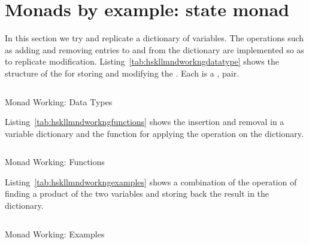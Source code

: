 \documentclass[thesis-solanki.tex]{subfiles}
\begin{document}
\section{Monads by example: state monad}

In this section we try and replicate a dictionary of variables. The operations such as adding and removing entries
to and from the dictionary are implemented so as to replicate modification.
Listing~\ref{tab:hskllmndworkngdatatype} shows the structure of the  for
storing and modifying the .
Each  is a ,  pair.

\begin{code-list}[H]
  \begin{singlespace}
    \inputminted[linenos, firstline=22, lastline=35]{haskell}{haskell-monad-working-2.hs}
  \end{singlespace}
  \caption{ Monad Working: Data Types}
\label{tab:hskllmndworkngdatatype}
\end{code-list}

Listing~\ref{tab:hskllmndworkngfunctions} shows the insertion and removal in a variable dictionary and the
 function for applying the operation on the dictionary. 

\begin{code-list}[H]
  \begin{singlespace}
    \inputminted[linenos, firstline=37
      , lastline=71
    ]{haskell}{haskell-monad-working-2.hs}
  \end{singlespace}
  \caption{ Monad Working: Functions}
\label{tab:hskllmndworkngfunctions}
\end{code-list}

Listing~\ref{tab:hskllmndworkngexamples} shows a combination of the operation of finding a product of the two
variables and storing back the result in the dictionary.


\begin{code-list}[H]
  \begin{singlespace}
    \inputminted[linenos, firstline=73, lastline=86]{haskell}{haskell-monad-working-2.hs}
  \end{singlespace}
  \caption{ Monad Working: Examples}
\label{tab:hskllmndworkngexamples}
\end{code-list}
\end{document}
